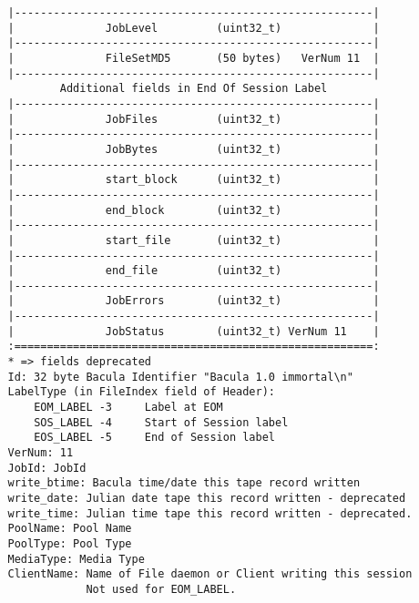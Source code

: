 \begin{verbatim}
   |-------------------------------------------------------|
   |              JobLevel         (uint32_t)              |
   |-------------------------------------------------------|
   |              FileSetMD5       (50 bytes)   VerNum 11  |
   |-------------------------------------------------------|
           Additional fields in End Of Session Label
   |-------------------------------------------------------|
   |              JobFiles         (uint32_t)              |
   |-------------------------------------------------------|
   |              JobBytes         (uint32_t)              |
   |-------------------------------------------------------|
   |              start_block      (uint32_t)              |
   |-------------------------------------------------------|
   |              end_block        (uint32_t)              |
   |-------------------------------------------------------|
   |              start_file       (uint32_t)              |
   |-------------------------------------------------------|
   |              end_file         (uint32_t)              |
   |-------------------------------------------------------|
   |              JobErrors        (uint32_t)              |
   |-------------------------------------------------------|
   |              JobStatus        (uint32_t) VerNum 11    |
   :=======================================================:
   * => fields deprecated
   Id: 32 byte Bacula Identifier "Bacula 1.0 immortal\n"
   LabelType (in FileIndex field of Header):
       EOM_LABEL -3     Label at EOM
       SOS_LABEL -4     Start of Session label
       EOS_LABEL -5     End of Session label
   VerNum: 11
   JobId: JobId
   write_btime: Bacula time/date this tape record written
   write_date: Julian date tape this record written - deprecated
   write_time: Julian time tape this record written - deprecated.
   PoolName: Pool Name
   PoolType: Pool Type
   MediaType: Media Type
   ClientName: Name of File daemon or Client writing this session
               Not used for EOM_LABEL.
\end{verbatim}
\normalsize
